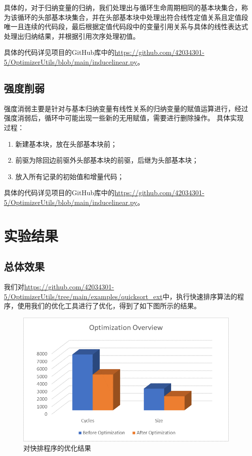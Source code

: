 \documentclass[cn,black,11pt,normal]{elegantnote}
\begin{document}
具体的，对于归纳变量的归纳，我们处理出与循环生命周期相同的基本块集合，称为该循环的头部基本块集合，并在头部基本块中处理出符合线性定值关系且定值段唯一且连续的代码段，最后根据定值代码段中的变量引用关系与具体的线性表达式处理出归纳结果，并根据引用次序处理初值。

具体的代码详见项目的GitHub库中的\url{https://github.com/42034301-5/OptimizerUtils/blob/main/inducelinear.py}。

\subsection{强度削弱}

强度消弱主要是针对与基本归纳变量有线性关系的归纳变量的赋值运算进行，经过强度消弱后，循环中可能出现一些新的无用赋值，需要进行删除操作。
具体实现过程：

\begin{enumerate}
    \item 新建基本块，放在头部基本块前；
    \item 前驱为除回边前驱外头部基本块的前驱，后继为头部基本块；
    \item 放入所有记录的初始值和增量代码；
\end{enumerate}

具体的代码详见项目的GitHub库中的\url{https://github.com/42034301-5/OptimizerUtils/blob/main/inducelinear.py}。

\section{实验结果}

\subsection{总体效果}

我们对\url{https://github.com/42034301-5/OptimizerUtils/tree/main/examples/quicksort_ext}中，执行快速排序算法的程序，使用我们的优化工具进行了优化，得到了如下图所示的结果。

\begin{figure}[H]
    \centering
    \includegraphics[width=0.8\linewidth]{image/quicksort_opt.png}
    \caption{对快排程序的优化结果}
\end{figure}
\end{document}
